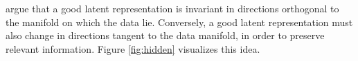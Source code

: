 \documentclass[twoside]{article}
\begin{document}
\cite{rifai2011higher} argue that a good latent representation is invariant in directions orthogonal to the manifold on which the data lie.  Conversely, a good latent representation must also change in directions tangent to the data manifold, in order to preserve relevant information.  Figure \ref{fig:hidden} visualizes this idea.
%
\begin{figure}[t]
\centering
\end{figure}
\end{document}
